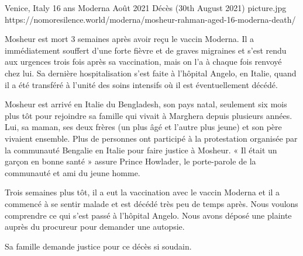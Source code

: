 {Venice, Italy}
{16 ans}
{Moderna}
{Août 2021}
{Décès (30th August 2021)}
{picture.jpg}
{https://nomoresilence.world/moderna/mosheur-rahman-aged-16-moderna-death/}
{

Mosheur est mort 3 semaines après avoir reçu le vaccin Moderna. Il a
immédiatement souffert d’une forte fièvre et de graves migraines et s’est rendu
aux urgences trois fois après sa vaccination, mais on l’a à chaque fois renvoyé
chez lui. Sa dernière hospitalisation s’est faite à l’hôpital Angelo, en Italie,
quand il a été transféré à l’unité des soins intensifs où il est éventuellement
décédé.

Mosheur est arrivé en Italie du Bengladesh, son pays natal, seulement six mois
plus tôt pour rejoindre sa famille qui vivait à Marghera depuis plusieurs
années. Lui, sa maman, ses deux frères (un plus âgé et l’autre plus jeune) et
son père vivaient ensemble. Plus de personnes ont participé à la protestation
organisée par la communauté Bengalie en Italie pour faire justice à Mosheur. «
Il était un garçon en bonne santé » assure Prince Howlader, le porte-parole de
la communauté et ami du jeune homme.

Trois semaines plus tôt, il a eut la vaccination avec le vaccin Moderna et il a
commencé à se sentir malade et est décédé très peu de temps après. Nous voulons
comprendre ce qui s’est passé à l’hôpital Angelo. Nous avons déposé une plainte
auprès du procureur pour demander une autopsie.

Sa famille demande justice pour ce décès si soudain.

}
